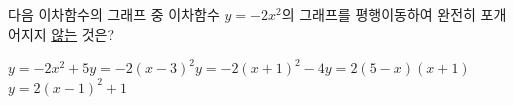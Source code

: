 다음 이차함수의 그래프 중 이차함수 $y=-2x^2$의 그래프를 평행이동하여 완전히 포개어지지 \underline{않는} 것은?
\begin{choicesii}{$y=-2x^2+5$}{$y=-2(x-3)^2$}{$y=-2(x+1)^2-4$}{$y=2(5-x)(x+1)$}{$y=2(x-1)^2+1$}\end{choicesii}
